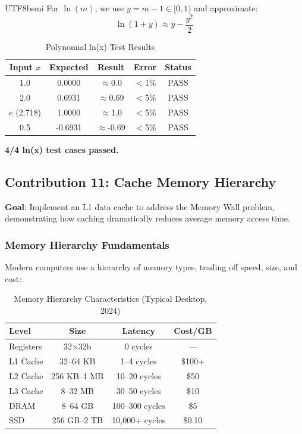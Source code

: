 \documentclass[journal,twoside]{IEEEtran}
\begin{document}
\begin{CJK}{UTF8}{bsmi}
For $\ln(m)$, we use $y = m - 1 \in [0, 1)$ and approximate:
\begin{equation}
\ln(1+y) \approx y - \frac{y^2}{2}
\end{equation}

\begin{table}[!t]
\centering
\caption{Polynomial ln(x) Test Results}
\footnotesize
\begin{tabular}{@{}ccccc@{}}
\toprule
\textbf{Input $x$} & \textbf{Expected} & \textbf{Result} & \textbf{Error} & \textbf{Status} \\
\midrule
1.0 & 0.0000 & $\approx$0.0 & $<$1\% & PASS \\
2.0 & 0.6931 & $\approx$0.69 & $<$5\% & PASS \\
$e$ (2.718) & 1.0000 & $\approx$1.0 & $<$5\% & PASS \\
0.5 & -0.6931 & $\approx$-0.69 & $<$5\% & PASS \\
\bottomrule
\end{tabular}
\end{table}

\textbf{4/4 ln(x) test cases passed.}

\FloatBarrier
\subsection{Contribution 11: Cache Memory Hierarchy}

\textbf{Goal}: Implement an L1 data cache to address the Memory Wall problem, demonstrating how caching dramatically reduces average memory access time.

\subsubsection{Memory Hierarchy Fundamentals}
Modern computers use a hierarchy of memory types, trading off speed, size, and cost:

\begin{table}[!t]
\centering
\caption{Memory Hierarchy Characteristics (Typical Desktop, 2024)}
\footnotesize
\begin{tabular}{@{}lccc@{}}
\toprule
\textbf{Level} & \textbf{Size} & \textbf{Latency} & \textbf{Cost/GB} \\
\midrule
Registers & 32$\times$32b & 0 cycles & --- \\
L1 Cache & 32--64 KB & 1--4 cycles & \$100+ \\
L2 Cache & 256 KB--1 MB & 10--20 cycles & \$50 \\
L3 Cache & 8--32 MB & 30--50 cycles & \$10 \\
DRAM & 8--64 GB & 100--300 cycles & \$5 \\
SSD & 256 GB--2 TB & 10,000+ cycles & \$0.10 \\
\bottomrule
\end{tabular}
\end{table}


\end{CJK}
\end{document}

